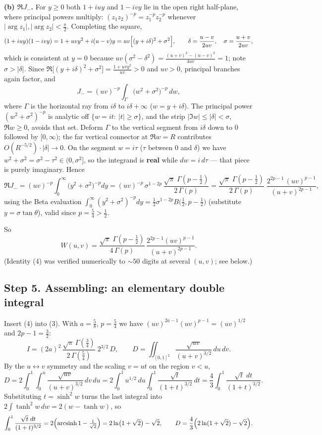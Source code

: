 \documentclass[11pt]{article}
\theoremstyle{remark}
\begin{document}
\textbf{(b) $\Re J_{-}$.} For $y\ge0$ both $1+iuy$ and $1-ivy$ lie in the open right half-plane, where principal powers multiply: $(z_1z_2)^{-p}=z_1^{-p}z_2^{-p}$ whenever $|\arg z_1|,|\arg z_2|<\tfrac\pi2$. Completing the square,
$$(1+iuy)(1-ivy)=1+uvy^2+i(u-v)y=uv\Bigl[(y+i\delta)^2+\sigma^2\Bigr],
\qquad \delta=\frac{u-v}{2uv},\quad \sigma=\frac{u+v}{2uv},$$
which is consistent at $y=0$ because $uv(\sigma^2-\delta^2)=\frac{(u+v)^2-(u-v)^2}{4uv}=1$; note $\sigma>|\delta|$. Since $\Re\bigl[(y+i\delta)^2+\sigma^2\bigr]=\frac{1+uvy^2}{uv}>0$ and $uv>0$, principal branches again factor, and
$$J_{-}=(uv)^{-p}\int_{\Gamma}\bigl(w^2+\sigma^2\bigr)^{-p}\,dw,$$
where $\Gamma$ is the horizontal ray from $i\delta$ to $i\delta+\infty$ ($w=y+i\delta$). The principal power $(w^2+\sigma^2)^{-p}$ is analytic off $\{w=it:\ |t|\ge\sigma\}$, and the strip $|\Im w|\le|\delta|<\sigma$, $\Re w\ge0$, avoids that set. Deform $\Gamma$ to the vertical segment from $i\delta$ down to $0$ followed by $[0,\infty)$; the far vertical connector at $\Re w=R$ contributes $O(R^{-5/2})\cdot|\delta|\to0$. On the segment $w=i\tau$ ($\tau$ between $0$ and $\delta$) we have $w^2+\sigma^2=\sigma^2-\tau^2\in(0,\sigma^2]$, so the integrand is \textbf{real} while $dw=i\,d\tau$ — that piece is purely imaginary. Hence
$$\Re J_{-}=(uv)^{-p}\int_0^\infty\bigl(y^2+\sigma^2\bigr)^{-p}dy
=(uv)^{-p}\,\sigma^{1-2p}\,\frac{\sqrt\pi\;\Gamma\!\left(p-\tfrac12\right)}{2\,\Gamma(p)}
=\frac{\sqrt\pi\;\Gamma\!\left(p-\tfrac12\right)}{2\,\Gamma(p)}\;
\frac{2^{2p-1}\,(uv)^{p-1}}{(u+v)^{2p-1}},$$
using the Beta evaluation $\int_0^\infty(y^2+\sigma^2)^{-p}dy=\tfrac12\sigma^{1-2p}B\bigl(\tfrac12,p-\tfrac12\bigr)$ (substitute $y=\sigma\tan\theta$), valid since $p=\tfrac54>\tfrac12$.

So
\begin{equation}
W(u,v)=\frac{\sqrt\pi\;\Gamma\!\left(p-\tfrac12\right)}{4\,\Gamma(p)}\,
\frac{2^{2p-1}(uv)^{p-1}}{(u+v)^{2p-1}} . \tag{4}
\end{equation}
(Identity (4) was verified numerically to $\sim50$ digits at several $(u,v)$; see below.)

\subsection*{Step 5. Assembling: an elementary double integral}

Insert (4) into (3). With $a=\tfrac58$, $p=\tfrac54$ we have $(uv)^{2a-1}(uv)^{p-1}=(uv)^{1/2}$ and $2p-1=\tfrac32$:
$$
I=(2a)^2\,\frac{\sqrt\pi\,\Gamma\!\left(\tfrac34\right)}{2\,\Gamma\!\left(\tfrac54\right)}\;2^{3/2}\,D,
\qquad
D=\iint_{[0,1]^2}\frac{\sqrt{uv}}{(u+v)^{3/2}}\,du\,dv .
$$
By the $u\leftrightarrow v$ symmetry and the scaling $v=ut$ on the region $v<u$,
$$D=2\int_0^1\!\!\int_0^u\frac{\sqrt{uv}}{(u+v)^{3/2}}\,dv\,du
=2\int_0^1 u^{1/2}\,du\int_0^1\frac{\sqrt t}{(1+t)^{3/2}}\,dt
=\frac43\int_0^1\frac{\sqrt t\;dt}{(1+t)^{3/2}} .$$
Substituting $t=\sinh^2 w$ turns the last integral into $2\int\tanh^2w\,dw=2(w-\tanh w)$, so
$$\int_0^1\frac{\sqrt t\;dt}{(1+t)^{3/2}}
=2\Bigl(\operatorname{arcsinh}1-\tfrac1{\sqrt2}\Bigr)=2\ln\bigl(1+\sqrt2\bigr)-\sqrt2,
\qquad
D=\frac43\Bigl(2\ln(1+\sqrt2)-\sqrt2\Bigr).$$
\end{document}
